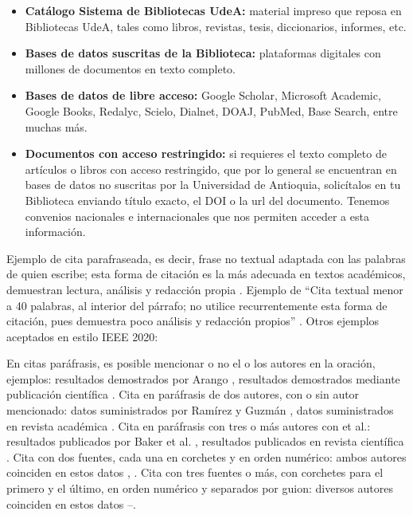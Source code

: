 \begin{itemize}
    \item \textbf{Catálogo Sistema de Bibliotecas UdeA:} material impreso que reposa en Bibliotecas UdeA, tales como libros, revistas, tesis, diccionarios, informes, etc.
    \item\textbf{Bases de datos suscritas de la Biblioteca:} plataformas digitales con millones de documentos en texto completo.
    \item\textbf{Bases de datos de libre acceso:} Google Scholar, Microsoft Academic, Google Books, Redalyc, Scielo, Dialnet, DOAJ, PubMed, Base Search, entre muchas más.
    \item\textbf{Documentos con acceso restringido:} si requieres el texto completo de artículos o libros con acceso restringido, que por lo general se encuentran en bases de datos no suscritas por la Universidad de Antioquia, solicítalos en tu Biblioteca enviando título exacto, el DOI o la url del documento. Tenemos convenios nacionales e internacionales que nos permiten acceder a esta información.
\end{itemize}

Ejemplo de cita parafraseada, es decir, frase no textual adaptada con las palabras de quien escribe; esta forma de citación es la más adecuada en textos académicos, demuestran lectura, análisis y redacción propia \cite{sec:pediatria}. Ejemplo de “Cita textual menor a 40 palabras, al interior del párrafo; no utilice recurrentemente esta forma de citación, pues demuestra poco análisis y redacción propios” \cite[p. 9]{opc:ramirez}. Otros ejemplos aceptados en estilo IEEE 2020:

En citas paráfrasis, es posible mencionar o no el o los autores en la oración, ejemplos: resultados demostrados por Arango \cite{sec:pediatria}, resultados demostrados mediante publicación científica \cite{sec:pediatria}. Cita en paráfrasis de dos autores, con o sin autor mencionado: datos suministrados por Ramírez y Guzmán \cite{opc:ramirez}, datos suministrados en revista académica \cite{opc:ramirez}. Cita en paráfrasis con tres o más autores con et al.: resultados publicados por Baker et al. \cite{art:baker}, resultados publicados en revista científica \cite{art:baker}. Cita con dos fuentes, cada una en corchetes y en orden numérico: ambos autores coinciden en estos datos \cite{opc:bbva}, \cite{opc:film}. Cita con tres fuentes o más, con corchetes para el primero y el último, en orden numérico y separados por guion: diversos autores coinciden en estos datos \cite{opc:bbva}–\cite{lib:ieee}. 

